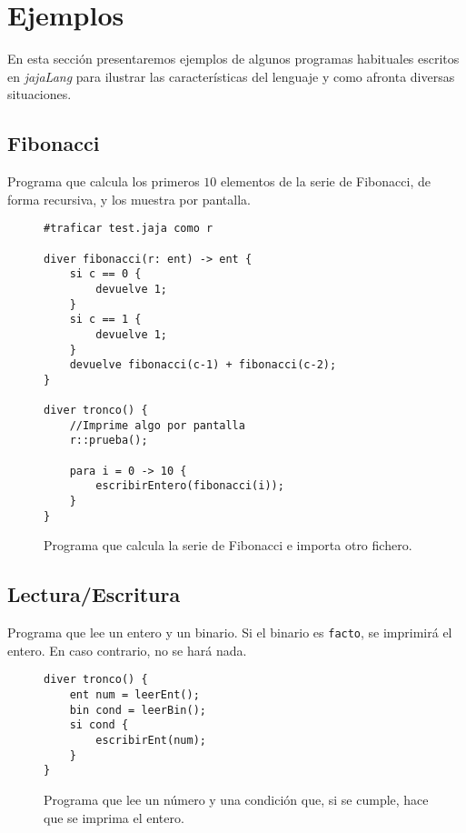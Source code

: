 \section{Ejemplos}
En esta sección presentaremos ejemplos de algunos programas habituales escritos
en \textit{jajaLang} para ilustrar las características del lenguaje y como
afronta diversas situaciones.

\subsection{Fibonacci}
Programa que calcula los primeros $10$ elementos de la serie de Fibonacci, de forma
recursiva, y los muestra por pantalla.
\begin{figure}[htbp]
    \centering
    \begin{lstlisting}
#traficar test.jaja como r

diver fibonacci(r: ent) -> ent {
    si c == 0 {
        devuelve 1; 
    }
    si c == 1 {
        devuelve 1;
    }
    devuelve fibonacci(c-1) + fibonacci(c-2);
}

diver tronco() {
    //Imprime algo por pantalla
    r::prueba();

    para i = 0 -> 10 {
        escribirEntero(fibonacci(i));
    } 
}
    \end{lstlisting}
    \caption{Programa que calcula la serie de Fibonacci e importa otro fichero.}
\end{figure}

\subsection{Lectura/Escritura}
Programa que lee un entero y un binario. Si el binario es \lstinline{facto}, se
imprimirá el entero. En caso contrario, no se hará nada.
\begin{figure}[htbp]
    \centering
    \begin{lstlisting}
diver tronco() {
    ent num = leerEnt();
    bin cond = leerBin();
    si cond {
        escribirEnt(num);
    }
}
    \end{lstlisting}
    \caption{Programa que lee un número y una condición que, si se cumple, hace
    que se imprima el entero.}
\end{figure}

